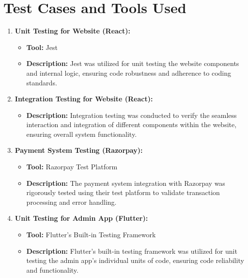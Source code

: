 \documentclass[12pt,a4paper]{report}
\begin{document}
\clearpage
\section{Test Cases and Tools Used}

\begin{enumerate}
    \item \textbf{Unit Testing for Website (React):}
          \begin{itemize}
              \item \textbf{Tool:} Jest
              \item \textbf{Description:} Jest was utilized for unit testing the website components and internal logic, ensuring code robustness and adherence to coding standards.
          \end{itemize}

    \item \textbf{Integration Testing for Website (React):}
          \begin{itemize}
              \item \textbf{Description:} Integration testing was conducted to verify the seamless interaction and integration of different components within the website, ensuring overall system functionality.
          \end{itemize}

    \item \textbf{Payment System Testing (Razorpay):}
          \begin{itemize}
              \item \textbf{Tool:} Razorpay Test Platform
              \item \textbf{Description:} The payment system integration with Razorpay was rigorously tested using their test platform to validate transaction processing and error handling.
          \end{itemize}

    \item \textbf{Unit Testing for Admin App (Flutter):}
          \begin{itemize}
              \item \textbf{Tool:} Flutter's Built-in Testing Framework
              \item \textbf{Description:} Flutter's built-in testing framework was utilized for unit testing the admin app's individual units of code, ensuring code reliability and functionality.
          \end{itemize}


\end{enumerate}
\end{document}
